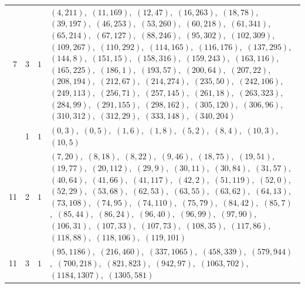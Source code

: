 \documentclass[11pt]{article}
\begin{document}
\begin{longtable}{@{}rrl>{\raggedright\arraybackslash}p{}@{}}
7 & 3 & $1$ & $(4,211)$,\allowbreak\ $(11,169)$,\allowbreak\ $(12,47)$,\allowbreak\ $(16,263)$,\allowbreak\ $(18,78)$,\allowbreak\ $(39,197)$,\allowbreak\ $(46,253)$,\allowbreak\ $(53,260)$,\allowbreak\ $(60,218)$,\allowbreak\ $(61,341)$,\allowbreak\ $(65,214)$,\allowbreak\ $(67,127)$,\allowbreak\ $(88,246)$,\allowbreak\ $(95,302)$,\allowbreak\ $(102,309)$,\allowbreak\ $(109,267)$,\allowbreak\ $(110,292)$,\allowbreak\ $(114,165)$,\allowbreak\ $(116,176)$,\allowbreak\ $(137,295)$,\allowbreak\ $(144,8)$,\allowbreak\ $(151,15)$,\allowbreak\ $(158,316)$,\allowbreak\ $(159,243)$,\allowbreak\ $(163,116)$,\allowbreak\ $(165,225)$,\allowbreak\ $(186,1)$,\allowbreak\ $(193,57)$,\allowbreak\ $(200,64)$,\allowbreak\ $(207,22)$,\allowbreak\ $(208,194)$,\allowbreak\ $(212,67)$,\allowbreak\ $(214,274)$,\allowbreak\ $(235,50)$,\allowbreak\ $(242,106)$,\allowbreak\ $(249,113)$,\allowbreak\ $(256,71)$,\allowbreak\ $(257,145)$,\allowbreak\ $(261,18)$,\allowbreak\ $(263,323)$,\allowbreak\ $(284,99)$,\allowbreak\ $(291,155)$,\allowbreak\ $(298,162)$,\allowbreak\ $(305,120)$,\allowbreak\ $(306,96)$,\allowbreak\ $(310,312)$,\allowbreak\ $(312,29)$,\allowbreak\ $(333,148)$,\allowbreak\ $(340,204)$\\
\addlinespace[3pt]
11 & 1 & $1$ & $(0,3)$,\allowbreak\ $(0,5)$,\allowbreak\ $(1,6)$,\allowbreak\ $(1,8)$,\allowbreak\ $(5,2)$,\allowbreak\ $(8,4)$,\allowbreak\ $(10,3)$,\allowbreak\ $(10,5)$\\
11 & 2 & $1$ & $(7,20)$,\allowbreak\ $(8,18)$,\allowbreak\ $(8,22)$,\allowbreak\ $(9,46)$,\allowbreak\ $(18,75)$,\allowbreak\ $(19,51)$,\allowbreak\ $(19,77)$,\allowbreak\ $(20,112)$,\allowbreak\ $(29,9)$,\allowbreak\ $(30,11)$,\allowbreak\ $(30,84)$,\allowbreak\ $(31,57)$,\allowbreak\ $(40,64)$,\allowbreak\ $(41,66)$,\allowbreak\ $(41,117)$,\allowbreak\ $(42,2)$,\allowbreak\ $(51,119)$,\allowbreak\ $(52,0)$,\allowbreak\ $(52,29)$,\allowbreak\ $(53,68)$,\allowbreak\ $(62,53)$,\allowbreak\ $(63,55)$,\allowbreak\ $(63,62)$,\allowbreak\ $(64,13)$,\allowbreak\ $(73,108)$,\allowbreak\ $(74,95)$,\allowbreak\ $(74,110)$,\allowbreak\ $(75,79)$,\allowbreak\ $(84,42)$,\allowbreak\ $(85,7)$,\allowbreak\ $(85,44)$,\allowbreak\ $(86,24)$,\allowbreak\ $(96,40)$,\allowbreak\ $(96,99)$,\allowbreak\ $(97,90)$,\allowbreak\ $(106,31)$,\allowbreak\ $(107,33)$,\allowbreak\ $(107,73)$,\allowbreak\ $(108,35)$,\allowbreak\ $(117,86)$,\allowbreak\ $(118,88)$,\allowbreak\ $(118,106)$,\allowbreak\ $(119,101)$\\
11 & 3 & $1$ & $(95,1186)$,\allowbreak\ $(216,460)$,\allowbreak\ $(337,1065)$,\allowbreak\ $(458,339)$,\allowbreak\ $(579,944)$,\allowbreak\ $(700,218)$,\allowbreak\ $(821,823)$,\allowbreak\ $(942,97)$,\allowbreak\ $(1063,702)$,\allowbreak\ $(1184,1307)$,\allowbreak\ $(1305,581)$\\

\end{longtable}
\end{document}
